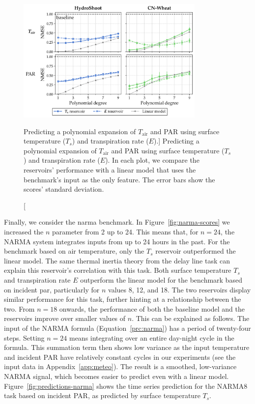 \begin{figure}[hp]
	\centering
    \includegraphics[width=0.82\textwidth]{img/comp_polynomial_perf.png}
	\caption%
	    [Predicting a polynomial expansion of $T_{\text{air}}$ and PAR using surface temperature ($T_s$) and transpiration rate ($E$).]%
	    {Predicting a polynomial expansion of $T_{\text{air}}$ and PAR using surface temperature ($T_s$) and transpiration rate ($E$).
	    In each plot, we compare the reservoirs' performance with a linear model that uses the benchmark's input as the only feature.
	    The error bars show the scores' standard deviation.}
	\label{fig:poly-task-scores}
\end{figure}


Finally, we consider the \acrshort{narma} benchmark.
In \mbox{Figure \ref{fig:narma-scores}} we increased the $n$ parameter from 2 up to 24. 
This means that, for $n=24$, the NARMA system integrates inputs from up to 24 hours in the past.
For the benchmark based on air temperature, only the $T_s$ reservoir outperformed the linear model. 
The same thermal inertia theory from the delay line task can explain this reservoir's correlation with this task.
Both surface temperature $T_s$ and transpiration rate $E$ outperform the linear model for the benchmark based on incident \acrshort{par}, particularly for $n$ values 8, 12, and 18.
The two reservoirs display similar performance for this task, further hinting at a relationship between the two.
From $n=18$ onwards, the performance of both the baseline model and the reservoirs improve over smaller values of $n$.
This can be explained as follows.
The input of the NARMA formula (\mbox{Equation \ref{prc:narma}}) has a period of twenty-four steps.
Setting $n=24$ means integrating over an entire day-night cycle in the formula.
This summation term then shows low variance as the input temperature and incident PAR have relatively constant cycles in our experiments (see the input data in \mbox{Appendix \ref{app:meteo}}).
The result is a smoothed, low-variance NARMA signal, which becomes easier to predict even with a linear model.
\mbox{Figure \ref{fig:predictions-narma}} shows the time series prediction for the NARMA8 task based on incident PAR, as predicted by surface temperature $T_s$.



